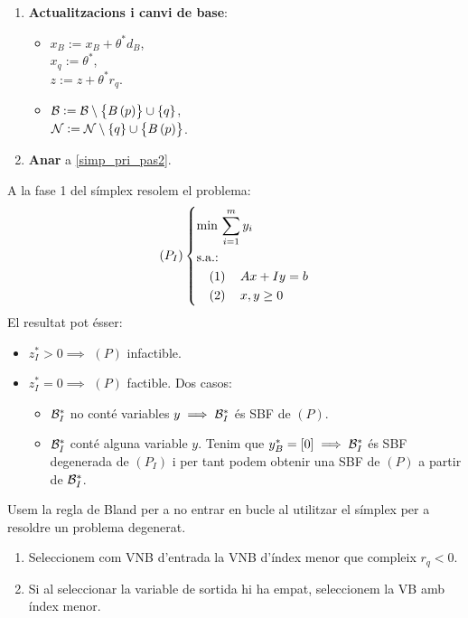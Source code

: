 \begin{alg}
\begin{enumerate}
        \item {\bf Actualitzacions i canvi de base}:
            \begin{itemize}
                \item $x_B := x_B + \theta^*d_B$, \\
                    $x_q := \theta^*$, \\
                    $z := z + \theta^* r_q$.
                \item $\mathcal{B} := \mathcal{B} \setminus \left\{B\left(p\right)\right\} \cup \left\{q\right\}$, \\
                    $\mathcal{N} := \mathcal{N} \setminus \left\{q\right\} \cup \left\{B\left(p\right)\right\}$.
            \end{itemize}
        \item {\bf Anar} a \ref{simp_pri_pas2}.
    \end{enumerate}
\end{alg}
\begin{propobs}
    A la fase 1 del símplex resolem el problema:
    \begin{equation*}
        \lp P_I \rp \begin{dcases*}
            \min\, \sum_{i = 1}^m y_i \\
            \text{s.a.: } \\
            \quad \left( 1 \right) \quad Ax + Iy = b \\
            \quad \left( 2 \right) \quad x, y \geq 0 \\
        \end{dcases*}
    \end{equation*}
    El resultat pot ésser:
    \begin{itemize}
        \item $z_I^* > 0 \implies$ $\left(P\right)$ infactible.
        \item $z_I^* = 0 \implies$ $\left(P\right)$ factible. Dos casos:
            \begin{itemize}
                \item $\mathcal{B}_I^*$ no conté variables $y \implies \mathcal{B}_I^*$ és SBF de $\left(P\right)$.
                \item $\mathcal{B}_I^*$ conté alguna variable $y$. Tenim que $y_B^* = \left[0\right] \implies \mathcal{B}_I^*$ és SBF degenerada de $\left(P_I\right)$ i per tant podem obtenir una SBF de $\left(P\right)$ a partir de $\mathcal{B}_I^*$.
            \end{itemize}
    \end{itemize}
\end{propobs}
\begin{rgl}[de Bland] \label{rgl:bland}
    Usem la regla de Bland per a no entrar en bucle al utilitzar el símplex per a resoldre un problema degenerat.
    \begin{enumerate}
        \item Seleccionem com VNB d'entrada la VNB d'índex menor que compleix $r_q < 0$.
        \item Si al seleccionar la variable de sortida hi ha empat, seleccionem la VB amb índex menor.
    \end{enumerate}
\end{rgl}

